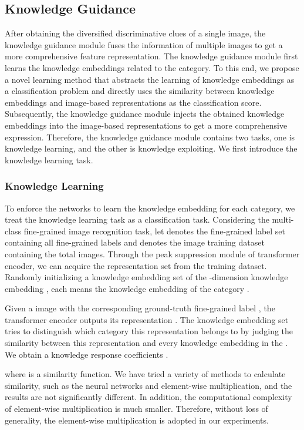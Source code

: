 \documentclass[5p,twocolumn]{elsarticle}
\begin{document}
\subsection{Knowledge Guidance} \label{sec.kg}

After obtaining the diversified discriminative clues of a single image, the knowledge guidance module fuses the information of multiple images to get a more comprehensive feature representation. The knowledge guidance module first learns the knowledge embeddings related to the category. To this end, we propose a novel learning method that abstracts the learning of knowledge embeddings as a classification problem and directly uses the similarity between knowledge embeddings and image-based representations as the classification score. Subsequently, the knowledge guidance module injects the obtained knowledge embeddings into the image-based representations to get a more comprehensive expression. Therefore, the knowledge guidance module contains two tasks, one is knowledge learning, and the other is knowledge exploiting. We first introduce the knowledge learning task.

\subsubsection{Knowledge Learning} 
To enforce the networks to learn the knowledge embedding for each category, we treat the knowledge learning task as a classification task. 
Considering the multi-class fine-grained image recognition task, let  denotes the fine-grained label set containing all  fine-grained labels and   denotes the image training dataset containing the total  images. Through the peak suppression module of transformer encoder, we can acquire the representation set  from the training dataset.
Randomly initializing a knowledge embedding set of the -dimension knowledge embedding , each  means the knowledge embedding of the category .

Given a image  with the corresponding ground-truth fine-grained label , the transformer encoder outputs its representation . 
The knowledge embedding set tries to distinguish which category this representation  belongs to by judging the similarity between this representation  and every knowledge embedding  in the . We obtain a knowledge response coefficients .

where  is a similarity function. We have tried a variety of methods to calculate similarity, such as the neural networks and element-wise multiplication, and the results are not significantly different. In addition, the computational complexity of element-wise multiplication is much smaller. Therefore, without loss of generality, the element-wise multiplication is adopted in our experiments.
\end{document}
